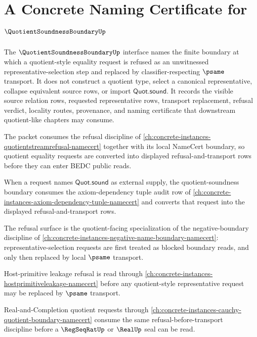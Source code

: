 \chapter{A Concrete Naming Certificate for $\QuotientSoundnessBoundaryUp$}
\label{ch:concrete-instances-quotient-soundness-boundary-namecert}

The $\QuotientSoundnessBoundaryUp$ interface names the finite boundary at which a quotient-style equality request is refused as an unwitnessed representative-selection step and replaced by classifier-respecting $\psame$ transport. It does not construct a quotient type, select a canonical representative, collapse equivalent source rows, or import $\mathsf{Quot.sound}$. It records the visible source relation rows, requested representative rows, transport replacement, refusal verdict, locality routes, provenance, and naming certificate that downstream quotient-like chapters may consume.

The packet consumes the refusal discipline of \autoref{ch:concrete-instances-quotientstreamrefusal-namecert} together with its local NameCert boundary, so quotient equality requests are converted into displayed refusal-and-transport rows before they can enter BEDC public reads.

When a request names $\mathsf{Quot.sound}$ as external supply, the quotient-soundness boundary consumes the axiom-dependency tuple audit row of \autoref{ch:concrete-instances-axiom-dependency-tuple-namecert} and converts that request into the displayed refusal-and-transport rows.

The refusal surface is the quotient-facing specialization of the negative-boundary discipline of \autoref{ch:concrete-instances-negative-name-boundary-namecert}: representative-selection requests are first treated as blocked boundary reads, and only then replaced by local $\psame$ transport.

Host-primitive leakage refusal is read through \autoref{ch:concrete-instances-hostprimitiveleakage-namecert} before any quotient-style representative request may be replaced by $\psame$ transport.

Real-and-Completion quotient requests through \autoref{ch:concrete-instances-cauchy-quotient-boundary-namecert} consume the same refusal-before-transport discipline before a $\RegSeqRatUp$ or $\RealUp$ seal can be read.

